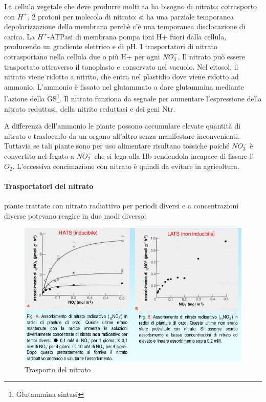 \documentclass[a4paper,12pt]{book}
\begin{document}
La cellula vegetale che deve produrre molti aa ha bisogno di nitrato: cotrasporto con $H^{+}$, 2 protoni per molecola di nitrato: si ha una parziale temporanea depolarizzazione della membrana perchè c'è una temporanea disclocazione di carica.
La $H^{+}$-ATPasi di membrana pompa ioni H+ fuori dalla cellula, producendo un gradiente elettrico e di pH. I trasportatori di nitrato cotrasportano nella cellula due o più H+ per ogni $NO_{3}^{-}$. Il nitrato può essere trasportato attraverso il tonoplasto e conservato nel vacuolo. Nel citosol, il nitrato viene ridotto a nitrito, che entra nel plastidio dove viene ridotto ad ammonio. L'ammonio è fissato nel glutammato a dare glutammina mediante l'azione della GS\footnote{Glutammina sintasi}. Il nitrato funziona da segnale per aumentare l'espressione della nitrato reduttasi, della nitrito reduttasi e dei geni Ntr.

A differenza dell’ammonio le piante possono accumulare elevate quantità di nitrato e traslocarlo da un organo all’altro senza manifestare inconvenienti. Tuttavia se tali piante sono per uso alimentare risultano tossiche poiché $NO_{3}^{-}$ è convertito nel fegato a $NO_{2}^{-}$ che si lega alla Hb rendendola incapace di fissare l’$O_{2}$. L’eccessiva concimazione con nitrato è quindi da evitare in agricoltura.

\paragraph{Trasportatori del nitrato} piante trattate con nitrato radiattivo per periodi diversi e a concentrazioni diverse potevano reagire in due modi diverso:
\begin{figure}[H]
\centering
\includegraphics[scale=0.43]{immagini/trasporto1.jpg}
\caption{Trasporto del nitrato}
\end{figure}
 
\end{document}

